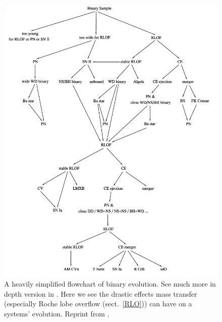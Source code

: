 \documentclass[12pt, a4paper]{article}
\begin{document}
    \vspace*{\fill}
    \begin{figure}[H]
        \centering
        \includegraphics[width=\textwidth]{figs/reused-figs/Han_BinaryEvolFlowchart.png}
        \caption{A heavily simplified flowchart of binary evolution. See much more in depth version in \parencite{Chen_2024}. Here we see the drastic effects mass transfer (especially Roche lobe overflow (sect.~\ref{RLO})) can have on a systems' evolution. Reprint from \parencite{Han_2008}.}
        \label{fig:binary_evolution_flowchart}
    \end{figure}
    \vspace*{\fill}
    \restoregeometry
\end{document}
